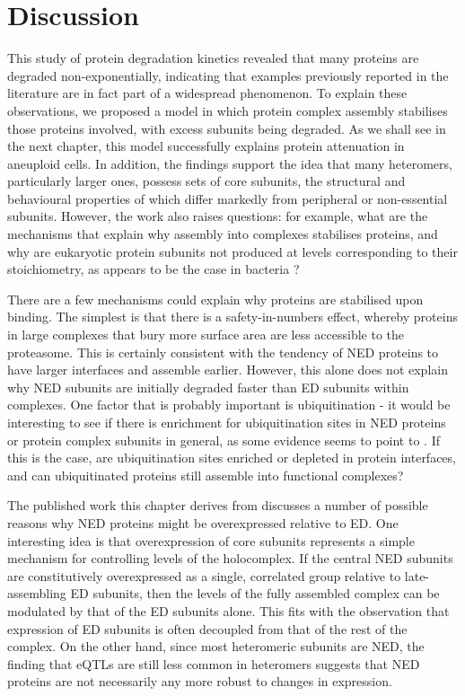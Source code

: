 \documentclass[a4paper,11pt,twoside,openright]{scrbook}
\begin{document}
\section{Discussion}

This study of protein degradation kinetics revealed that many proteins are
degraded non-exponentially, indicating that examples previously reported in the
literature are in fact part of a widespread phenomenon. To explain these
observations, we proposed a model in which protein complex assembly stabilises
those proteins involved, with excess subunits being degraded. As we shall see in
the next chapter, this model successfully explains protein attenuation in
aneuploid cells. In addition, the findings support the idea that many
heteromers, particularly larger ones, possess sets of core subunits, the
structural and behavioural properties of which differ markedly from peripheral
or non-essential subunits. However, the work also raises questions: for example,
what are the mechanisms that explain why assembly into complexes stabilises
proteins, and why are eukaryotic protein subunits not produced at levels
corresponding to their stoichiometry, as appears to be the case in bacteria
\cite{Li2014b}?

There are a few mechanisms could explain why proteins are stabilised upon
binding. The simplest is that there is a safety-in-numbers effect, whereby
proteins in large complexes that bury more surface area are less accessible to
the proteasome. This is certainly consistent with the tendency of NED proteins
to have larger interfaces and assemble earlier. However, this alone does not
explain why NED subunits are initially degraded faster than ED subunits within
complexes. One factor that is probably important is ubiquitination - it would be
interesting to see if there is enrichment for ubiquitination sites in NED
proteins or protein complex subunits in general, as some evidence seems to point
to \cite{Chen2014}. If this is the case, are ubiquitination sites enriched or
depleted in protein interfaces, and can ubiquitinated proteins still assemble
into functional complexes?

The published work this chapter derives from discusses a number of possible
reasons why NED proteins might be overexpressed relative to ED. One interesting
idea is that overexpression of core subunits represents a simple mechanism for
controlling levels of the holocomplex. If the central NED subunits are
constitutively overexpressed as a single, correlated group relative to
late-assembling ED subunits, then the levels of the fully assembled complex can
be modulated by that of the ED subunits alone. This fits with the observation
that expression of ED subunits is often decoupled from that of the rest of the
complex. On the other hand, since most heteromeric subunits are NED, the finding
that eQTLs are still less common in heteromers suggests that NED proteins are
not necessarily any more robust to changes in expression.
\end{document}
